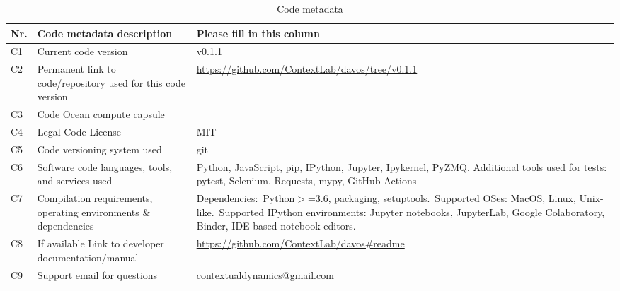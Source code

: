 \documentclass[preprint,12pt, a4paper]{elsarticle}
\begin{document}
\begin{table}[H]
\begin{tabular}{|l|p{6.5cm}|p{6.5cm}|}
\hline
\textbf{Nr.} & \textbf{Code metadata description} & \textbf{Please fill in this column} \\
\hline
C1 & Current code version &  v0.1.1 \\
\hline
C2 & Permanent link to code/repository used for this code version & \url{https://github.com/ContextLab/davos/tree/v0.1.1} \\
\hline
C3 & Code Ocean compute capsule & \\
\hline
C4 & Legal Code License & MIT \\
\hline
C5 & Code versioning system used & git \\
\hline
C6 & Software code languages, tools, and services used & Python, JavaScript, pip, IPython, Jupyter, Ipykernel, PyZMQ. Additional tools used for tests: pytest, Selenium, Requests, mypy, GitHub Actions \\
\hline
C7 & Compilation requirements, operating environments \& dependencies & Dependencies:~Python$>$=3.6, packaging, setuptools.~Supported OSes: MacOS, Linux, Unix-like.~Supported IPython environments: Jupyter notebooks, JupyterLab, Google Colaboratory, Binder, IDE-based notebook editors. \\
\hline
C8 & If available Link to developer documentation/manual & \url{https://github.com/ContextLab/davos\#readme} \\
\hline
C9 & Support email for questions & contextualdynamics@gmail.com \\
\hline
\end{tabular}
\caption{Code metadata}
\label{}
\end{table}

\linenumbers


\end{document}
